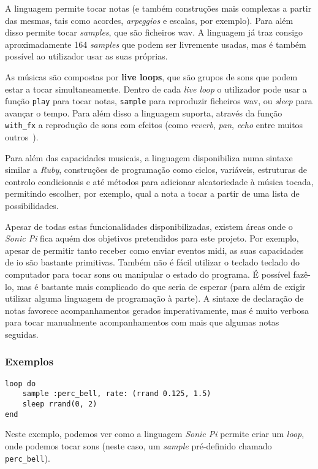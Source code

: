 A linguagem permite tocar notas (e também construções mais complexas a partir das mesmas, tais como acordes, \textit{arpeggios} e escalas, por exemplo). Para além disso permite tocar \textit{samples}, que são ficheiros \acrfull{wav}. A linguagem já traz consigo aproximadamente 164 \textit{samples} que podem ser livremente usadas, mas é também possível ao utilizador usar as suas próprias.

As músicas são compostas por \textbf{live loops}, que são grupos de sons que podem estar a tocar simultaneamente. Dentro de cada \textit{live loop} o utilizador pode usar a função \texttt{play} para tocar notas, \texttt{sample} para reproduzir ficheiros \acrshort{wav}, ou \textit{sleep} para avançar o tempo. Para além disso a linguagem suporta, através da função \texttt{with\_fx} a reprodução de sons com efeitos (como \textit{reverb}, \textit{pan}, \textit{echo} entre muitos outros~\citep{sonic-pi-fx}).

Para além das capacidades musicais, a linguagem disponibiliza numa sintaxe similar a \textit{Ruby}, construções de programação como ciclos, variáveis, estruturas de controlo condicionais e até métodos para adicionar aleatoriedade à música tocada, permitindo escolher, por exemplo, qual a nota a tocar a partir de uma lista de possibilidades.

Apesar de todas estas funcionalidades disponibilizadas, existem áreas onde o \textit{Sonic Pi} fica aquém dos objetivos pretendidos para este projeto. Por exemplo, apesar de permitir tanto receber como enviar eventos \acrshort{midi}, as suas capacidades de \acrfull{io} são bastante primitivas. Também não é fácil utilizar o teclado teclado do computador para tocar sons ou manipular o estado do programa. É possível fazê-lo, mas é bastante mais complicado do que seria de esperar (para além de exigir utilizar alguma linguagem de programação à parte). A sintaxe de declaração de notas favorece acompanhamentos gerados imperativamente, mas é muito verbosa para tocar manualmente acompanhamentos com mais que algumas notas seguidas.

\subsubsection{Exemplos}
\begin{lstlisting}[caption={Reproduzir um \textit{sample} com valores aleatórios}] 
loop do
    sample :perc_bell, rate: (rrand 0.125, 1.5)
    sleep rrand(0, 2)
end
\end{lstlisting}
Neste exemplo, podemos ver como a linguagem \textit{Sonic Pi} permite criar um \textit{loop}, onde podemos tocar sons (neste caso, um \textit{sample} pré-definido chamado \texttt{perc\_bell}).

